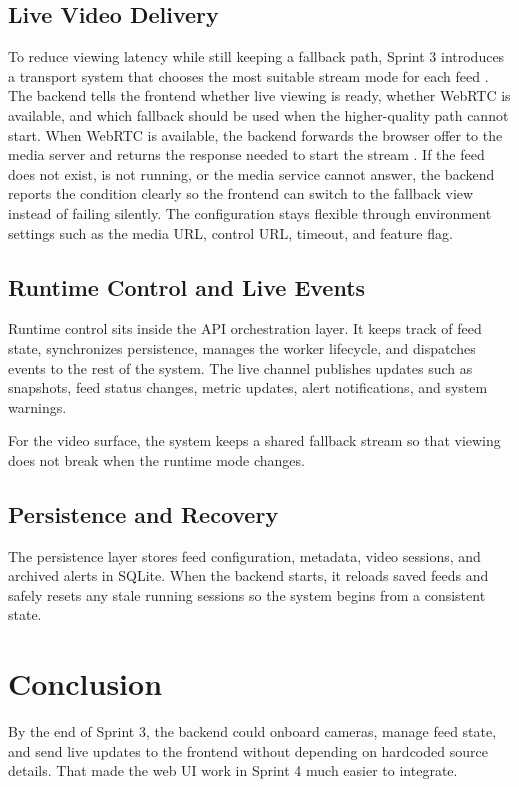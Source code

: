 \subsection{Live Video Delivery}
To reduce viewing latency while still keeping a fallback path, Sprint 3 introduces a transport system that chooses the most suitable stream mode for each feed \cite{webrtc_w3c,ietf_rfc8830}. The backend tells the frontend whether live viewing is ready, whether WebRTC is available, and which fallback should be used when the higher-quality path cannot start. When WebRTC is available, the backend forwards the browser offer to the media server and returns the response needed to start the stream \cite{mediamtx_docs}. If the feed does not exist, is not running, or the media service cannot answer, the backend reports the condition clearly so the frontend can switch to the fallback view instead of failing silently. The configuration stays flexible through environment settings such as the media URL, control URL, timeout, and feature flag.

\subsection{Runtime Control and Live Events}
Runtime control sits inside the API orchestration layer. It keeps track of feed state, synchronizes persistence, manages the worker lifecycle, and dispatches events to the rest of the system. The live channel publishes updates such as snapshots, feed status changes, metric updates, alert notifications, and system warnings.

For the video surface, the system keeps a shared fallback stream so that viewing does not break when the runtime mode changes.

\subsection{Persistence and Recovery}
The persistence layer stores feed configuration, metadata, video sessions, and archived alerts in SQLite. When the backend starts, it reloads saved feeds and safely resets any stale running sessions so the system begins from a consistent state.

\section{Conclusion}
By the end of Sprint 3, the backend could onboard cameras, manage feed state, and send live updates to the frontend without depending on hardcoded source details. That made the web UI work in Sprint 4 much easier to integrate.
